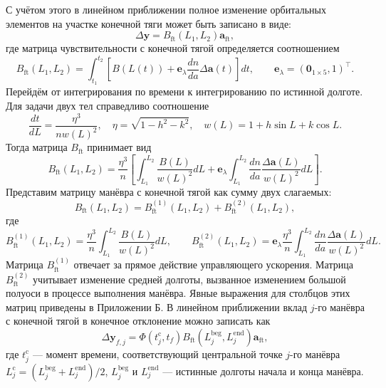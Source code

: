С учётом этого в линейном приближении полное изменение орбитальных элементов на участке конечной тяги может быть записано в виде: 
\begin{equation}
    \Delta \mathbf{y} = B_{\text{ft}} (L_1, L_2) \mathbf{a}_{\text{ft}},
\end{equation}
где матрица чувствительности с конечной тягой определяется соотношением
\begin{equation}
    B_{\text{ft}} (L_1, L_2) = \int_{t_1}^{t_2} \left[ B(L(t)) + 
    \mathbf{e}_\lambda \frac{dn}{da} \Delta \mathbf{a}(t) \right] dt, \quad \quad
    \mathbf{e}_\lambda = \left( \mathbf{0}_{1 \times 5}, 1 \right)^\top.
\label{B_ft_t}
\end{equation}
Перейдём от интегрирования по времени к интегрированию по истинной долготе. Для задачи двух тел справедливо соотношение
\begin{equation}
    \frac{dt}{dL} = \frac{\eta^3}{n w(L)^2}, \quad
    \eta = \sqrt{1 - h^2 - k^2}, \quad
    w(L) = 1 + h \sin{L} + k \cos{L}.
\end{equation}
Тогда матрица $B_{\text{ft}}$ принимает вид
\begin{equation}
    B_{\text{ft}} (L_1, L_2) = \frac{\eta^3}{n} \left[ \int_{L_1}^{L_2} \frac{B(L)}{w(L)^2} dL + \mathbf{e}_\lambda \int_{L_1}^{L_2} \frac{dn}{da} \frac{\Delta \mathbf{a}(L)}{w(L)^2} dL \right].
\label{B_ft}
\end{equation}
Представим матрицу манёвра с конечной тягой как сумму двух слагаемых:
\begin{equation}
    B_{\text{ft}} (L_1, L_2) = B_{\text{ft}}^{(1)} (L_1, L_2) + 
    B_{\text{ft}}^{(2)} (L_1, L_2),
\end{equation}
где
\begin{equation}
    B_{\text{ft}}^{(1)} (L_1, L_2) = \frac{\eta^3}{n} \int_{L_1}^{L_2} \frac{B(L)}{w(L)^2} dL, \quad \quad
    B_{\text{ft}}^{(2)} (L_1, L_2) = \mathbf{e}_\lambda \frac{\eta^3}{n} \int_{L_1}^{L_2} \frac{dn}{da} \frac{\Delta \mathbf{a}(L)}{w(L)^2} dL.
\label{B_ft_1_and_B_ft_2}
\end{equation}
Матрица $B_{\text{ft}}^{(1)}$ отвечает за прямое действие управляющего ускорения. Матрица $B_{\text{ft}}^{(2)}$ учитывает изменение средней долготы, вызванное изменением большой полуоси в процессе выполнения манёвра. Явные выражения для столбцов этих матриц приведены в Приложении Б. В линейном приближении вклад $j$-го манёвра с конечной тягой в конечное отклонение можно записать как
\begin{equation*}
    \Delta \mathbf{y}_{f, j} = \Phi (t_j^\text{c}, t_f) B_{\text{ft}} (L_j^{\text{beg}}, L_j^{\text{end}}) \mathbf{a}_{\text{ft}},
\end{equation*}
где $t_j^\text{c}$ --- момент времени, соответствующий центральной точке $j$-го манёвра $L_j^\text{c} = (L_j^{\text{beg}} + L_j^{\text{end}}) / 2$, $L_j^{\text{beg}}$ и $L_j^{\text{end}}$ --- истинные долготы начала и конца манёвра.

